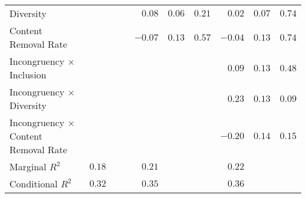 \begin{table*}[t!]
\begin{tabular}{lrrlrrlrrl}
    Diversity & & & & $0.08$ & $0.06$ & $0.21$ & $0.02$ & $0.07$ & $0.74$\\
    Content Removal Rate & & & & $-0.07$ & $0.13$ & $0.57$ & $-0.04$ & $0.13$ &$0.74$\\ \addlinespace
    Incongruency $\times$ Inclusion  & & & & & & & $0.09$ & $0.13$ & $0.48$\\
    Incongruency $\times$ Diversity & & & & & & & $0.23$ & $0.13$ & $0.09$\\
    Incongruency $\times$ Content Removal Rate & & & & & & & $-0.20$ & $0.14$ & $0.15$\\
    \midrule
    Marginal $R^2$ & $0.18$ & & & $0.21$ & & & $0.22$\\
    Conditional $R^2$ & $0.32$ & & & $0.35$ & & & $0.36$\\
    \bottomrule
    \end{tabular}
    \label{tab:model2}
\end{table*}